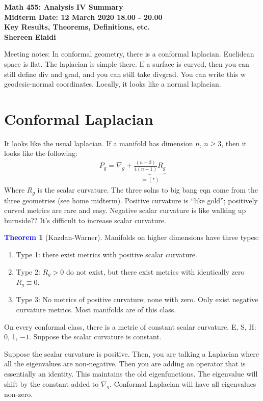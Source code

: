 \documentclass[11pt]{article}
\theoremstyle{definition}
\theoremstyle{definition}
\newtheorem{theorem}{\textcolor{blue}{Theorem}}
\theoremstyle{definition}
\theoremstyle{remark}
\begin{document}
\begin{center}
	\textbf{Math 455: Analysis IV Summary} \\
	\textbf{Midterm Date: 12 March 2020 18.00 - 20.00} \\
	\textbf{Key Results, Theorems, Definitions, etc.} \\
	\textbf{Shereen Elaidi}
\end{center}

Meeting notes: In conformal geometry, there is a conformal laplacian. Euclidean space is flat. The laplacian is simple there. If a surface is curved, then you can still define div and grad, and you can still take $\text{div} \text{grad}$. You can write this w geodesic-normal coordinates. Locally, it looks like a normal laplacian. 

\section{Conformal Laplacian}
It looks like the usual laplacian. If a manifold has dimension $n$, $n \geq 3$, then it looks like the following:  
\begin{align*}
	P_g =  \nabla_g + \underbrace{\frac{(n-2)}{4(n-1)}R_g}_{:= (*)}
\end{align*}
Where $R_g$ is the scalar curvature. The three solns to big bang eqn come from the three geometries (see home midterm). Positive curvature is ``like gold''; positively curved metrics are rare and easy. Negative scalar curvature is like walking up burnside?? It's difficult to increase scalar curvature. 

\begin{theorem}[Kazdan-Warner]
	Manifolds on higher dimensions have three types: 
	\begin{enumerate}[noitemsep]
		\item Type 1: there exist metrics with positive scalar curvature.
		\item Type 2: $R_g > 0$ do not exist, but there exist metrics with identically zero $R_g \equiv 0$.  
		\item Type 3: No metrics of positive curvature; none with zero. Only exist negative curvature metrics. Most manifolds are of this class. 
	\end{enumerate}
	On every conformal class, there is a metric of constant scalar curvature. E, S, H: 0, 1, $-1$. Suppose the scalar curvature is constant. 
\end{theorem}

Suppose the scalar curvature is positive. Then, you are talking a Laplacian where all the eigenvalues are non-negative. Then you are adding an operator that is essentially an identity. This maintains the old eigenfunctions. The eigenvalue will shift by the constant added to $\nabla_g$. Conformal Laplacian will have all eigenvalues non-zero. 
\end{document}
